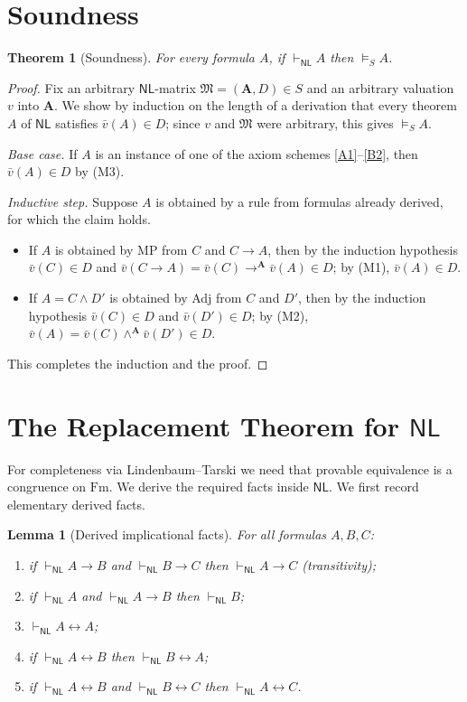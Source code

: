 \documentclass[12pt]{article}
\newtheorem{theorem}{Theorem}
\newtheorem{lemma}{Lemma}
\theoremstyle{definition}
\newcommand{\NL}{\mathsf{NL}}
\newcommand{\prv}{\vdash_{\NL}}
\newcommand{\vld}{\vDash}
\newcommand{\Fm}{\mathrm{Fm}}
\newcommand{\imp}{\rightarrow}
\newcommand{\bic}{\leftrightarrow}
\newcommand{\A}{\mathbf{A}}
\begin{document}
\section{Soundness}

\begin{theorem}[Soundness]\label{thm:sound}
For every formula $A$, if $\prv A$ then $\vld_{S}A$.
\end{theorem}

\begin{proof}
Fix an arbitrary $\NL$-matrix $\mathfrak M=(\A,D)\in S$ and an arbitrary
valuation $v$ into $\A$. We show by induction on the length of a derivation that
every theorem $A$ of $\NL$ satisfies $\bar v(A)\in D$; since $v$ and
$\mathfrak M$ were arbitrary, this gives $\vld_{S}A$.

\emph{Base case.} If $A$ is an instance of one of the axiom schemes
\eqref{A1}--\eqref{B2}, then $\bar v(A)\in D$ by (M3).

\emph{Inductive step.} Suppose $A$ is obtained by a rule from formulas already
derived, for which the claim holds.
\begin{itemize}
\item If $A$ is obtained by MP from $C$ and $C\imp A$, then by the induction
hypothesis $\bar v(C)\in D$ and $\bar v(C\imp A)=\bar v(C)\imp^{\A}\bar v(A)\in D$;
by (M1), $\bar v(A)\in D$.
\item If $A=C\wedge D'$ is obtained by Adj from $C$ and $D'$, then by the
induction hypothesis $\bar v(C)\in D$ and $\bar v(D')\in D$; by (M2),
$\bar v(A)=\bar v(C)\wedge^{\A}\bar v(D')\in D$.
\end{itemize}
This completes the induction and the proof.
\end{proof}

\section{The Replacement Theorem for $\NL$}

For completeness via Lindenbaum--Tarski we need that provable equivalence is a
congruence on $\Fm$. We derive the required facts inside $\NL$. We first record
elementary derived facts.

\begin{lemma}[Derived implicational facts]\label{lem:der}
For all formulas $A,B,C$:
\begin{enumerate}
\item[(a)] if $\prv A\imp B$ and $\prv B\imp C$ then $\prv A\imp C$
\emph{(transitivity)};
\item[(b)] if $\prv A$ and $\prv A\imp B$ then $\prv B$;
\item[(c)] $\prv A\bic A$;
\item[(d)] if $\prv A\bic B$ then $\prv B\bic A$;
\item[(e)] if $\prv A\bic B$ and $\prv B\bic C$ then $\prv A\bic C$.
\end{enumerate}
\end{lemma}
\end{document}
